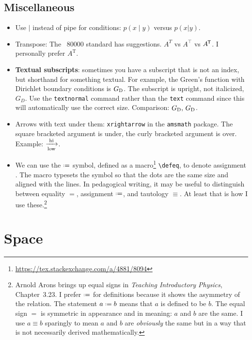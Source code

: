 \subsection{Miscellaneous}

\begin{itemize}
	\item Use $\mid$ instead of pipe for conditions: $p(x\mid y)$ versus $p(x|y)$.
	\item Transpose: The ~80000 standard has suggestions. $A^T$ vs $A^\top$ vs $A^{\trans}$. I personally prefer $A^\text{T}$.
	\item \textbf{Textual subscripts}: sometimes you have a subscript that is not an index, but shorthand for something textual. For example, the Green's function with Dirichlet boundary conditions is $G_\textnormal{D}$. The subscript is upright, not italicized, $G_D$. Use the \texttt{textnormal} command rather than the \texttt{text} command since this will automatically use the correct size. Comparison: $G_\textnormal{D},\, G_\text{D}$.
	\item Arrows with text under them: \texttt{xrightarrow} in the \texttt{amsmath} package. The square bracketed argument is under, the curly bracketed argument is over. Example: $\xrightarrow[\textnormal{low}]{\textnormal{hi}}$.
	\item We can use the $\defeq$ symbol, defined as a macro\footnote{\url{https://tex.stackexchange.com/a/4881/8094}} \verb!\defeq!, to denote assignment . The macro typesets the symbol so that the dots are the same size and aligned with the lines. In pedagogical writing, it may be useful to distinguish between equality $=$, assignment $\defeq$, and tautology $\equiv$. At least that is how I use these.\footnote{Arnold Arons brings up equal signs in \emph{Teaching Introductory Physics}, Chapter~3.23. I prefer $\defeq$ for definitions because it shows the asymmetry of the relation. The statement $a\defeq b$ means that $a$ is defined to be $b$. The equal sign $=$ is symmetric in appearance and in meaning: $a$ and $b$ are the same. I use  $a\equiv b$ sparingly to mean $a$ and $b$ are \emph{obviously} the same but in a way that is not necessarily derived mathematically. }
\end{itemize}



\section{Space}

